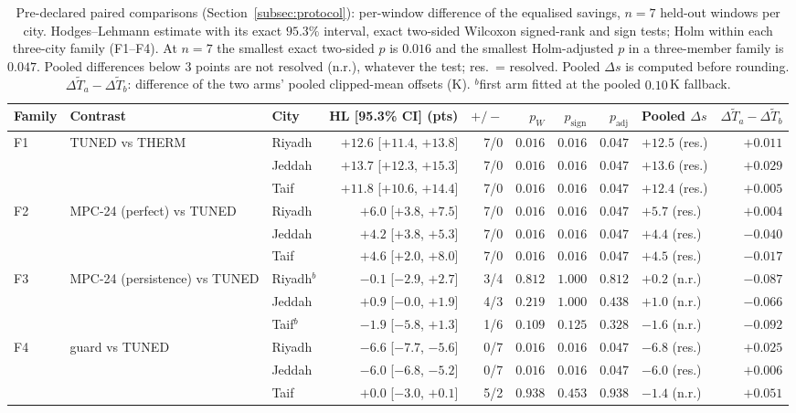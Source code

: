 \begin{table}[t]
\centering
\caption{Pre-declared paired comparisons (Section~\ref{subsec:protocol}): per-window difference of the equalised savings, $n=7$ held-out windows per city. Hodges--Lehmann estimate with its exact $95.3\%$ interval, exact two-sided Wilcoxon signed-rank and sign tests; Holm within each three-city family (F1--F4). At $n=7$ the smallest exact two-sided $p$ is $0.016$ and the smallest Holm-adjusted $p$ in a three-member family is $0.047$. Pooled differences below $3$ points are not resolved (n.r.), whatever the test; res.\ = resolved. Pooled $\Delta s$ is computed before rounding. $\Delta\tilde T_a-\Delta\tilde T_b$: difference of the two arms' pooled clipped-mean offsets (K). $^{b}$first arm fitted at the pooled $0.10\,$K fallback.}
\label{tab:stats}
\footnotesize\setlength{\tabcolsep}{3pt}
\begin{tabularx}{\textwidth}{@{}l>{\raggedright\arraybackslash}Xlrrrrrlr@{}}
\toprule
Family & Contrast & City & HL [95.3\% CI] (pts) & $+/-$ & $p_W$ & $p_{\mathrm{sign}}$ & $p_{\mathrm{adj}}$ & Pooled $\Delta s$ & $\Delta\tilde T_a-\Delta\tilde T_b$ \\
\midrule
F1 & TUNED vs THERM & Riyadh & $+12.6$ [$+11.4$, $+13.8$] & 7/0 & $0.016$ & $0.016$ & $0.047$ & $+12.5$ (res.) & $+0.011$ \\
 &  & Jeddah & $+13.7$ [$+12.3$, $+15.3$] & 7/0 & $0.016$ & $0.016$ & $0.047$ & $+13.6$ (res.) & $+0.029$ \\
 &  & Taif & $+11.8$ [$+10.6$, $+14.4$] & 7/0 & $0.016$ & $0.016$ & $0.047$ & $+12.4$ (res.) & $+0.005$ \\
F2 & MPC-24 (perfect) vs TUNED & Riyadh & $+6.0$ [$+3.8$, $+7.5$] & 7/0 & $0.016$ & $0.016$ & $0.047$ & $+5.7$ (res.) & $+0.004$ \\
 &  & Jeddah & $+4.2$ [$+3.8$, $+5.3$] & 7/0 & $0.016$ & $0.016$ & $0.047$ & $+4.4$ (res.) & $-0.040$ \\
 &  & Taif & $+4.6$ [$+2.0$, $+8.0$] & 7/0 & $0.016$ & $0.016$ & $0.047$ & $+4.5$ (res.) & $-0.017$ \\
F3 & MPC-24 (persistence) vs TUNED & Riyadh$^{b}$ & $-0.1$ [$-2.9$, $+2.7$] & 3/4 & $0.812$ & $1.000$ & $0.812$ & $+0.2$ (n.r.) & $-0.087$ \\
 &  & Jeddah & $+0.9$ [$-0.0$, $+1.9$] & 4/3 & $0.219$ & $1.000$ & $0.438$ & $+1.0$ (n.r.) & $-0.066$ \\
 &  & Taif$^{b}$ & $-1.9$ [$-5.8$, $+1.3$] & 1/6 & $0.109$ & $0.125$ & $0.328$ & $-1.6$ (n.r.) & $-0.092$ \\
F4 & guard vs TUNED & Riyadh & $-6.6$ [$-7.7$, $-5.6$] & 0/7 & $0.016$ & $0.016$ & $0.047$ & $-6.8$ (res.) & $+0.025$ \\
 &  & Jeddah & $-6.0$ [$-6.8$, $-5.2$] & 0/7 & $0.016$ & $0.016$ & $0.047$ & $-6.0$ (res.) & $+0.006$ \\
 &  & Taif & $+0.0$ [$-3.0$, $+0.1$] & 5/2 & $0.938$ & $0.453$ & $0.938$ & $-1.4$ (n.r.) & $+0.051$ \\
\bottomrule
\end{tabularx}
\end{table}
